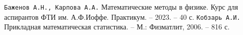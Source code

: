 \begin{thebibliography}{}
	\texttt{Баженов А.Н., Карпова А.А.} Математические методы в физике. Курс для аспирантов ФТИ им. А.Ф.Иоффе. Практикум. -- 2023. -- 40 с.
	\texttt{Кобзарь А.И.} Прикладная математическая статистика. -- М.: Физматлит, 2006. -- 816 с.
\end{thebibliography}